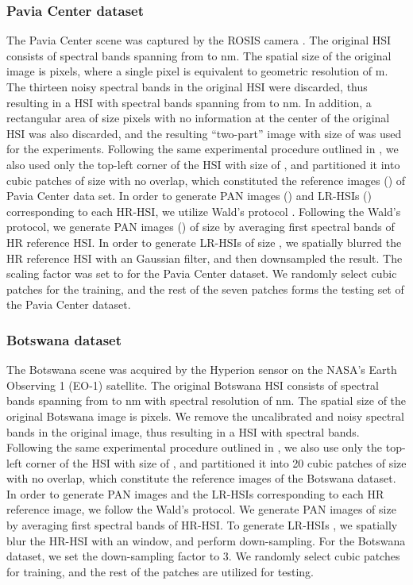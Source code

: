 \documentclass[journal]{IEEEtran}
\begin{document}
        \subsubsection{Pavia Center dataset} The Pavia Center scene was captured by the ROSIS camera \cite{ROSIS_camera}. The original HSI consists of  spectral bands spanning from  to  nm. The spatial size of the original image is  pixels, where a single pixel is equivalent to geometric resolution of  m. The thirteen noisy spectral bands in the original HSI were discarded, thus resulting in a HSI with  spectral bands spanning from  to  nm. In addition, a rectangular area of size  pixels with no information at the center of the original HSI was also discarded, and the resulting ``two-part'' image with size of  was used for the experiments. Following the same experimental procedure outlined in \cite{DHP-DARN}, we also used only the top-left corner of the HSI with size of , and partitioned it into  cubic patches of size  with no overlap, which constituted the reference images () of  Pavia Center data set. In order to generate PAN images () and LR-HSIs () corresponding to each HR-HSI, we utilize Wald's protocol \cite{walds_protocol}. Following the Wald's protocol, we generate PAN images () of size  by averaging first  spectral bands of HR reference HSI. In order to generate LR-HSIs of size , we spatially blurred the HR reference HSI with an  Gaussian filter, and then downsampled the result. The scaling factor  was set to  for the Pavia Center dataset. We randomly select  cubic patches for the training, and the rest of the seven patches forms the testing set of the Pavia Center dataset.
        
        \subsubsection{Botswana dataset} The Botswana scene was acquired by the Hyperion sensor on the NASA's Earth Observing 1 (EO-1) satellite. The original Botswana HSI consists of  spectral bands spanning from  to  nm with spectral resolution of  nm. The spatial size of the original Botswana image is  pixels. We remove the uncalibrated and noisy spectral bands in the original image, thus resulting in a HSI with  spectral bands. Following the same experimental procedure outlined in \cite{DHP-DARN}, we also use only the top-left corner of the HSI with size of , and partitioned it into 20 cubic patches of size  with no overlap, which constitute the reference images  of the Botswana dataset. In order to generate PAN images  and the LR-HSIs  corresponding to each HR reference image, we follow the Wald's protocol. We generate PAN images  of size  by averaging first  spectral bands of HR-HSI. To generate LR-HSIs , we spatially blur the HR-HSI with an  window, and perform  down-sampling. For the Botswana dataset, we set the down-sampling factor  to 3. We randomly select  cubic patches for  training, and the rest of the patches are utilized for  testing.
        
\end{document}
